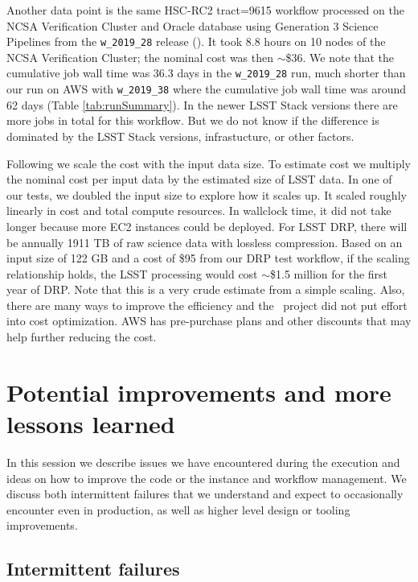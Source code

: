 Another data point is the same HSC-RC2 tract=9615 workflow processed on the NCSA Verification Cluster and Oracle database using Generation 3 Science Pipelines from the \texttt{w\_2019\_28} release ().
It took 8.8 hours on 10 nodes of the NCSA Verification Cluster; the nominal cost was then $\sim$\$36.
We note that the cumulative job wall time was 36.3 days in the \texttt{w\_2019\_28} run, much shorter than our run on AWS with \texttt{w\_2019\_38} where the cumulative job wall time was around 62 days (Table \ref{tab:runSummary}).
In the newer LSST Stack versions there are more jobs in total for this workflow.
But we do not know if the difference is dominated by the LSST Stack versions, infrastucture, or other factors.

Following  we scale the cost with the input data size.
To estimate cost we multiply the nominal cost per input data by the estimated size of LSST data.
In one of our tests, we doubled the input size to explore how it scales up.
It scaled roughly linearly in cost and total compute resources.
In wallclock time, it did not take longer because more EC2 instances could be deployed.
For LSST DRP, there will be annually 1911 TB of raw science data with lossless compression.
Based on an input size of 122 GB and a cost of \$95 from our DRP test workflow, if the scaling relationship holds, the LSST processing would cost $\sim$\$1.5 million for the first year of DRP.
Note that this is a very crude estimate from a simple scaling.
Also, there are many ways to improve the efficiency and the \poc~project did not put effort into cost optimization.
AWS has pre-purchase plans and other discounts that may help further reducing the cost.


\section{Potential improvements and more lessons learned} \label{sec:future}

In this session we describe issues we have encountered during the execution and ideas on how to improve the code or the instance and workflow management.
We discuss both intermittent failures that we understand and expect to occasionally encounter even in production, as well as higher level design or tooling improvements.

\subsection{Intermittent failures}

